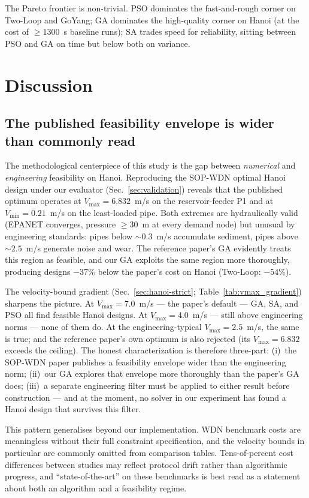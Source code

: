 \documentclass[conference]{IEEEtran}
\begin{document}
The Pareto frontier is non-trivial. PSO dominates the fast-and-rough corner on Two-Loop and GoYang; GA dominates the high-quality corner on Hanoi (at the cost of $\geq 1300$~s baseline runs); SA trades speed for reliability, sitting between PSO and GA on time but below both on variance.

\section{Discussion}
\label{sec:discussion}
\subsection{The published feasibility envelope is wider than commonly read}
The methodological centerpiece of this study is the gap between \emph{numerical} and \emph{engineering} feasibility on Hanoi. Reproducing the SOP-WDN optimal Hanoi design under our evaluator (Sec.~\ref{sec:validation}) reveals that the published optimum operates at $V_{\max}=6.832$~m/s on the reservoir-feeder P1 and at $V_{\min}=0.21$~m/s on the least-loaded pipe. Both extremes are hydraulically valid (EPANET converges, pressure $\geq 30$~m at every demand node) but unusual by engineering standards: pipes below $\sim 0.3$~m/s accumulate sediment, pipes above $\sim 2.5$~m/s generate noise and wear. The reference paper's GA evidently treats this region as feasible, and our GA exploits the same region more thoroughly, producing designs $-37\%$ below the paper's cost on Hanoi (Two-Loop: $-54\%$).

The velocity-bound gradient (Sec.~\ref{sec:hanoi-strict}; Table~\ref{tab:vmax_gradient}) sharpens the picture. At $V_{\max}=7.0$~m/s --- the paper's default --- GA, SA, and PSO all find feasible Hanoi designs. At $V_{\max}=4.0$~m/s --- still above engineering norms --- none of them do. At the engineering-typical $V_{\max}=2.5$~m/s, the same is true; and the reference paper's own optimum is also rejected (its $V_{\max}=6.832$ exceeds the ceiling). The honest characterization is therefore three-part: (i)~the SOP-WDN paper publishes a feasibility envelope wider than the engineering norm; (ii)~our GA explores that envelope more thoroughly than the paper's GA does; (iii)~a separate engineering filter must be applied to either result before construction --- and at the moment, no solver in our experiment has found a Hanoi design that survives this filter.

This pattern generalises beyond our implementation. WDN benchmark costs are meaningless without their full constraint specification, and the velocity bounds in particular are commonly omitted from comparison tables. Tens-of-percent cost differences between studies may reflect protocol drift rather than algorithmic progress, and ``state-of-the-art'' on these benchmarks is best read as a statement about both an algorithm and a feasibility regime.
\end{document}
